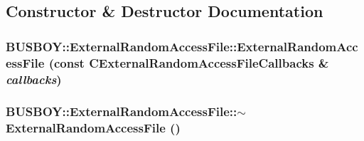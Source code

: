 \subsection{Constructor \& Destructor Documentation}
\hypertarget{classBUSBOY_1_1ExternalRandomAccessFile_a5c311bcb0cfb4acbac1736de957af192}{
\subsubsection[{ExternalRandomAccessFile}]{\setlength{\rightskip}{0pt plus 5cm}BUSBOY::ExternalRandomAccessFile::ExternalRandomAccessFile (const {\bf CExternalRandomAccessFileCallbacks} \& {\em callbacks})}}
\label{classBUSBOY_1_1ExternalRandomAccessFile_a5c311bcb0cfb4acbac1736de957af192}
\hypertarget{classBUSBOY_1_1ExternalRandomAccessFile_ab425cf187074bb879ffb61c8dd4cf846}{
\subsubsection[{$\sim$ExternalRandomAccessFile}]{\setlength{\rightskip}{0pt plus 5cm}BUSBOY::ExternalRandomAccessFile::$\sim$ExternalRandomAccessFile ()}}
\label{classBUSBOY_1_1ExternalRandomAccessFile_ab425cf187074bb879ffb61c8dd4cf846}


